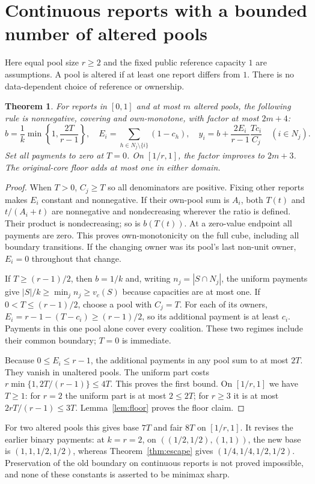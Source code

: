 \documentclass[11pt]{article}
\newtheorem{theorem}{Theorem}[section]
\theoremstyle{definition}\newtheorem{definition}[theorem]{Definition}
\theoremstyle{remark}\newtheorem{remark}[theorem]{Remark}
\begin{document}
\section{Continuous reports with a bounded number of altered pools}
Here equal pool size $r\ge2$ and the fixed public reference capacity $1$ are
assumptions. A pool is altered if at least one report differs from $1$.
There is no data-dependent choice of reference or ownership.

\begin{theorem}\label{thm:continuous}
For reports in $[0,1]$ and at most $m$ altered pools, the following rule is
nonnegative, covering and own-monotone, with factor at most $2m+4$:
\[
 b=\frac1k\min\left\{1,\frac{2T}{r-1}\right\},\quad
 E_i=\sum_{h\in N_j\setminus\{i\}}(1-c_h),\quad
 y_i=b+\frac{2E_i}{r-1}\frac{Tc_i}{C_j}\quad(i\in N_j).
\]
Set all payments to zero at $T=0$. On $[1/r,1]$, the factor improves to
$2m+3$. The original-core floor adds at most one in either domain.
\end{theorem}
\begin{proof}
When $T>0$, $C_j\ge T$ so all denominators are positive. Fixing other
reports makes $E_i$ constant and nonnegative. If their own-pool sum is $A_i$,
both $T(t)$ and $t/(A_i+t)$ are nonnegative and nondecreasing wherever the
ratio is defined. Their product is nondecreasing; so is $b(T(t))$. At a
zero-value endpoint all payments are zero. This proves own-monotonicity on
the full cube, including all boundary transitions. If the changing owner
was its pool's last non-unit owner, $E_i=0$ throughout that change.

If $T\ge(r-1)/2$, then $b=1/k$ and, writing
$n_j=|S\cap N_j|$, the uniform payments give
$|S|/k\ge\min_j n_j\ge v_c(S)$ because capacities are at most one.
If $0<T\le(r-1)/2$, choose a pool with $C_j=T$. For each of its owners,
$E_i=r-1-(T-c_i)\ge(r-1)/2$, so its additional payment is at least $c_i$.
Payments in this one pool alone cover every coalition. These two regimes
include their common boundary; $T=0$ is immediate.

Because $0\le E_i\le r-1$, the additional payments in any pool sum to at
most $2T$. They vanish in unaltered pools. The uniform part costs
$r\min\{1,2T/(r-1)\}\le4T$. This proves the first bound.
On $[1/r,1]$ we have $T\ge1$: for $r=2$ the uniform part is at most
$2\le2T$; for $r\ge3$ it is at most $2rT/(r-1)\le3T$.
Lemma~\ref{lem:floor} proves the floor claim.
\end{proof}
For two altered pools this gives base $7T$ and fair $8T$ on $[1/r,1]$.
It revises the earlier binary payments: at $k=r=2$, on
$((1/2,1/2),(1,1))$, the new base is $(1,1,1/2,1/2)$, whereas
Theorem~\ref{thm:escape} gives $(1/4,1/4,1/2,1/2)$.
Preservation of the old boundary on continuous reports is not proved
impossible, and none of these constants is asserted to be minimax sharp.
\end{document}
